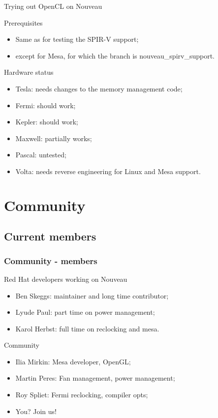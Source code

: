 \documentclass[11pt,english,compress]{beamer}
\begin{document}
\begin{frame}{Trying out OpenCL on Nouveau}
	\begin{block}{Prerequisites}
		\begin{itemize}
			\item Same as for testing the SPIR-V support;
			\item except for Mesa, for which the branch is
				nouveau\_spirv\_support.
		\end{itemize}
	\end{block}
	\begin{block}{Hardware status}
		\begin{itemize}
			\item Tesla: needs changes to the memory management
				code;
			\item Fermi: should work;
			\item Kepler: should work;
			\item Maxwell: partially works;
			\item Pascal: untested;
			\item Volta: needs reverse engineering for Linux and
				Mesa support.
		\end{itemize}
	\end{block}
\end{frame}

\section{Community}

\subsection{Current members}
\begin{frame}
	\frametitle{Community - members}

	\begin{block}{Red Hat developers working on Nouveau}
		\begin{itemize}
			\item Ben Skeggs: maintainer and long time contributor;
			\item Lyude Paul: part time on power management;
			\item Karol Herbst: full time on reclocking and mesa.
		\end{itemize}
	\end{block}

	\pause

	\begin{block}{Community}
		\begin{itemize}
			\item Ilia Mirkin: Mesa developer, OpenGL;
			\item Martin Peres: Fan management, power management;
			\item Roy Spliet: Fermi reclocking, compiler opts;
			\item You? Join us!
		\end{itemize}
	\end{block}
\end{frame}
\end{document}
